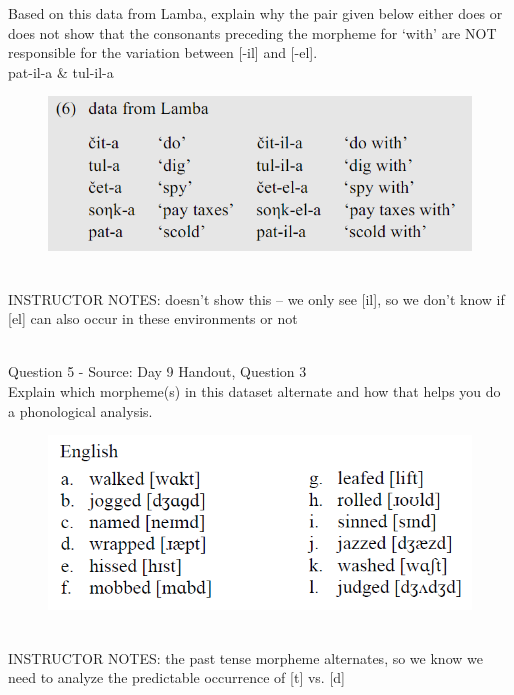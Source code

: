 \documentclass[12pt]{article}
\begin{document}
Based on this data from Lamba, explain why the pair given below either does or does not show that the consonants preceding the morpheme for `with' are NOT responsible for the variation between [-il] and [-el].\\

pat-il-a \& tul-il-a

\begin{figure}[H]
\includegraphics{../images/peng119_lamba.png}
\end{figure}

~\\
INSTRUCTOR NOTES: doesn't show this -- we only see [il], so we don't know if [el] can also occur in these environments or not


~\\

{\large Question 5} - Source: Day 9 Handout, Question 3\\

Explain which morpheme(s) in this dataset alternate and how that helps you do a phonological analysis.\\

\begin{figure}[H]
\includegraphics{../images/english_past.png}
\end{figure}

~\\
INSTRUCTOR NOTES: the past tense morpheme alternates, so we know we need to analyze the predictable occurrence of [t] vs. [d]
\end{document}
